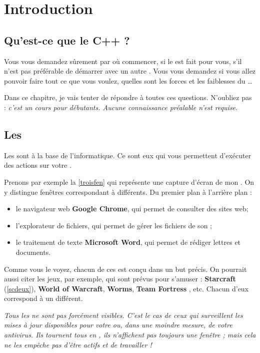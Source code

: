 \chapter{Introduction}
\section{Qu'est-ce que le C++ ?}
Vous vous demandez sûrement par où commencer, si le \cplus est fait pour vous, s'il n'est pas préférable de démarrer avec un autre \lang. Vous vous demandez si vous allez pouvoir faire tout ce que vous voulez, quelles sont les forces et les faiblesses du \cplus…

Dans ce chapitre, je vais tenter de répondre à toutes ces questions. 
N'oubliez pas : \emph{c'est un cours pour débutants. Aucune connaissance préalable n'est requise.} 
\section{Les \progs}
Les \progs sont à la base de l'informatique. Ce sont eux qui vous permettent d'exécuter des actions sur votre \ordi.

Prenons par exemple la \fig \ref{troisfen} qui représente une capture d'écran de mon \ordi. On y distingue  fenêtres correspondant à  \progs différents.
Du premier plan à l'arrière plan :


\begin{itemize}
	\item le navigateur web \textbf{Google Chrome}, qui permet de consulter des sites web;
	\item l'explorateur de fichiers, qui permet de gérer les fichiers de son \ordi;
	\item le traitement de texte \textbf{Microsoft Word}, qui permet de rédiger lettres et documents. 
\end{itemize}

Comme vous le voyez, chacun de ces \progs est conçu dans un but précis. On pourrait aussi citer les jeux, par exemple, qui sont prévus pour s'amuser : \textbf{Starcraft } (\fig \ref{scdeux}), \textbf{World of Warcraft},\textbf{ Worms}, \textbf{Team Fortress  } , etc. Chacun d'eux correspond à un \prog différent.



\emph{Tous les \progs ne sont pas forcément visibles. C'est le cas de ceux qui surveillent les mises à jour disponibles pour votre \ordi ou, dans une moindre mesure, de votre antivirus. Ils tournent tous en , ils n'affichent pas toujours une fenêtre ; mais cela ne les empêche pas d'être actifs et de travailler !}


